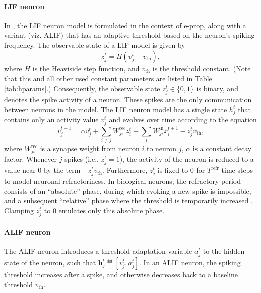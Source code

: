         \paragraph{LIF neuron}
            In \citet{bellec2020solution}, the LIF neuron model is formulated in the context of e-prop, along with a variant (viz. ALIF) that has an adaptive threshold based on the neuron's spiking frequency.
            The observable state of a LIF model is given by
            \begin{equation}
            z^t_j = H\left(v_j^t-v_\text{th}\right),
            \end{equation}
            where $H$ is the Heaviside step function, and $v_\text{th}$ is the threshold constant.
            (Note that this and all other used constant parameters are listed in Table \ref{tab:hparams}.)
            Consequently, the observable state $z^t_j \in \{0, 1\}$ is binary, and denotes the spike activity of a neuron.
            These spikes are the only communication between neurons in the model.
            The LIF neuron model has a single state $h^t_j$ that contains only an activity value $v^t_j$ and evolves over time according to the equation
            \begin{equation}\label{eq:alifV}
            v^{t+1}_j = \alpha v_j^t + \sum_{i\neq j}W^\text{rec}_{ji}z_i^t + \sum_i W^\text{in}_{ji}x_i^{t+1} - z_j^tv_
            \text{th},
            \end{equation}
            where $W^\text{rec}_{ji}$ is a synapse weight from neuron $i$ to neuron $j$, $\alpha$ is a constant decay factor.
            Whenever $j$ spikes (i.e., $z_j^t = 1$), the activity of the neuron is reduced to a value near 0 by the term $-z^t_jv_\text{th}$.
            Furthermore, $z^t_j$ is fixed to 0 for $T^\text{refr}$ time steps to model neuronal refractoriness.
            In biological neurons, the refractory period consists of an ``absolute'' phase, during which evoking a new spike is impossible, and a subsequent ``relative'' phase where the threshold is temporarily increased \citep{purves2008neuroscience}.
            Clamping $z^t_j$ to 0 emulates only this absolute phase.


        \paragraph{ALIF neuron}
            The ALIF neuron introduces a threshold adaptation variable $a^t_j$ to the hidden state of the neuron, such that $\mathbf{h}^t_j \eqdef \left[v^t_j, a^t_j\right]$.
            In an ALIF neuron, the spiking threshold increases after a spike, and otherwise decreases back to a baseline threshold $v_\text{th}$.

